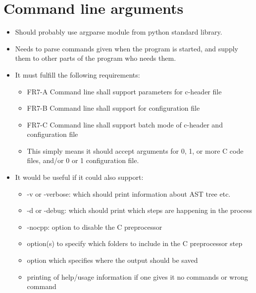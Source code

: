 \section{Command line arguments}
\begin{itemize}
	\item  Should probably use argparse module from python standard library.
	\item Needs to parse commands given when the program is started, and supply them to other parts of the program who needs them.
	\item It must fulfill the following requirements:
	\begin{itemize}
		\item FR7-A Command line shall support parameters for c-header file
		\item FR7-B Command line shall support for configuration file
		\item FR7-C Command line shall support batch mode of c-header and configuration file
		\item This simply means it should accept arguments for 0, 1, or more C code files, and/or 0 or 1 configuration file.
	\end{itemize}
	\item It would be useful if it could also support:
	\begin{itemize}
        		\item -v or -verbose: which should print information about AST tree etc.
        		\item -d or -debug: which should print which steps are happening in the process
        		\item -nocpp: option to disable the C preprocessor
        		\item option(s) to specify which folders to include in the C preprocessor step
        		\item option which specifies where the output should be saved
        		\item printing of help/usage information if one gives it no commands or wrong command
	\end{itemize}
\end{itemize}

